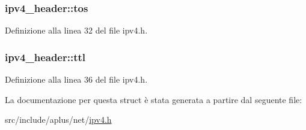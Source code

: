 \hypertarget{structipv4__header_abd794754c36bf40eec3845d1b4a30715}{
\subsubsection[{tos}]{ ipv4\+\_\+header\+::tos}}\label{structipv4__header_abd794754c36bf40eec3845d1b4a30715}


Definizione alla linea 32 del file ipv4.\+h.

\hypertarget{structipv4__header_a847be1c747cb3282ac66c766a176ecfd}{
\subsubsection[{ttl}]{ ipv4\+\_\+header\+::ttl}}\label{structipv4__header_a847be1c747cb3282ac66c766a176ecfd}


Definizione alla linea 36 del file ipv4.\+h.



La documentazione per questa struct è stata generata a partire dal seguente file\+:\begin{DoxyCompactItemize}
\item 
src/include/aplus/net/\hyperlink{ipv4_8h}{ipv4.\+h}\end{DoxyCompactItemize}
